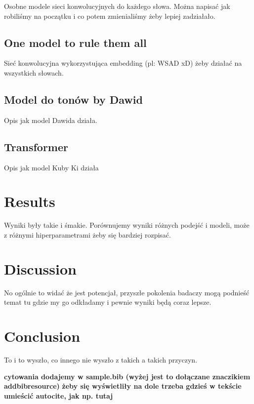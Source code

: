 \documentclass[
	a4paper, %
	10pt, %
	unnumberedsections, %
	twoside, %
]{LTJournalArticle}
\begin{document}
Osobne modele sieci konwolucyjnych do każdego słowa.
Można napisać jak robiliśmy na początku i co potem zmienialiśmy żeby lepiej zadziałało.

\subsection{One model to rule them all}

Sieć konwolucyjna wykorzystująca embedding (pl: WSAD xD) żeby działać na wszystkich słowach.

\subsection{Model do tonów by Dawid}

Opis jak model Dawida działa.

\subsection{Transformer}

Opis jak model Kuby Ki działa


\section{Results}

Wyniki były takie i śmakie. Porównujemy wyniki różnych podejść i modeli, może z różnymi hiperparametrami żeby się bardziej rozpisać.


\section{Discussion}

No ogólnie to widać że jest potencjał, przyszłe pokolenia badaczy mogą podnieść temat tu gdzie my go odkładamy i pewnie wyniki będą coraz lepsze.


\section{Conclusion}

To i to wyszło, co innego nie wyszło z takich a takich przyczyn.

\textbf{\color{red} cytowania dodajemy w sample.bib (wyżej jest to dołączane znaczikiem addbibresource)}
\textbf{\color{red} żeby się wyświetliły na dole trzeba gdzieś w tekście umieścić autocite, jak np. tutaj \autocite{TODO:2024}}


\printbibliography %

\end{document}
